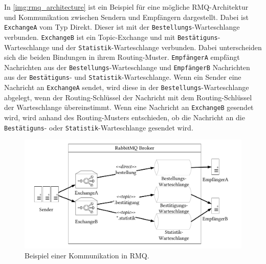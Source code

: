 In \autoref{img:rmq_architecture} ist ein Beispiel für eine mögliche RMQ-Architektur und Kommunikation zwischen Sendern und Empfängern dargestellt. Dabei ist \texttt{ExchangeA} vom Typ Direkt. Dieser ist mit der \texttt{Bestellungs}-Warteschlange verbunden. \texttt{ExchangeB} ist ein Topic-Exchange und mit \texttt{Bestätiguns}-Warteschlange und der \texttt{Statistik}-Warteschlange verbunden. Dabei unterscheiden sich die beiden Bindungen in ihrem Routing-Muster. \texttt{EmpfängerA} empfängt Nachrichten aus der \texttt{Bestellungs}-Warteschlange und \texttt{EmpfängerB} Nachrichten aus der \texttt{Bestätiguns}- und \texttt{Statistik}-Warteschlange. Wenn ein Sender eine Nachricht an \texttt{ExchangeA} sendet, wird diese in der \texttt{Bestellungs}-Warteschlange abgelegt, wenn der Routing-Schlüssel der Nachricht mit dem Routing-Schlüssel der Warteschlange übereinstimmt. Wenn eine Nachricht an \texttt{ExchangeB} gesendet wird, wird anhand des Routing-Musters entschieden, ob die Nachricht an die \texttt{Bestätiguns}- oder \texttt{Statistik}-Warteschlange gesendet wird. 
\begin{figure}
\center
  \includegraphics[width=1\textwidth]{images/measurement/rmqexample.pdf}
  \caption{Beispiel einer Kommunikation in RMQ.}
  \label{img:rmq_architecture}
\end{figure}

